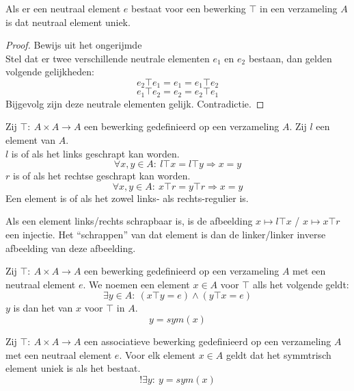 \documentclass[main.tex]{subfiles}
\begin{document}
\begin{st}
  \label{st:neutraal-element-uniek}
  Als er een neutraal element $e$ bestaat voor een bewerking $\top$ in een verzameling $A$ is dat neutraal element uniek.
  \begin{proof}
    Bewijs uit het ongerijmde\\
    Stel dat er twee verschillende neutrale elementen $e_{1}$ en $e_{2}$ bestaan, dan gelden volgende gelijkheden:    \[ e_{2}\top e_{1} = e_{1}  =e_{1}\top e_{2}\]
    \[ e_{1}\top e_{2} = e_{2}  =e_{2}\top e_{1}\]
    Bijgevolg zijn deze neutrale elementen gelijk. Contradictie.
  \end{proof}
\end{st}

\begin{de}
  Zij $\top:\ A\times A\rightarrow A$ een bewerking gedefinieerd op een verzameling $A$.
  Zij $l$ een element van $A$.\\
  $l$ is  of  als het links geschrapt kan worden.
  \[ \forall x,y \in A:\ l \top x = l \top y \Rightarrow x = y \]
  $r$ is  of  als het rechtse geschrapt kan worden.
  \[ \forall x,y \in A:\ x \top r = y \top r \Rightarrow x = y \]
  Een element is  of  als het zowel links- als rechts-regulier is. 
\end{de}

\begin{opm}
  Als een element links/rechts schrapbaar is, is de afbeelding $x \mapsto l\top x$ / $x \mapsto x\top r$ een injectie. Het ``schrappen'' van dat element is dan de linker/linker inverse afbeelding van deze afbeelding.
\end{opm}

\begin{de}
  Zij $\top:\ A\times A\rightarrow A$ een bewerking gedefinieerd op een verzameling $A$ met een neutraal element $e$.
  We noemen een element $x\in A$  voor $\top$ alls het volgende geldt:
  \[ \exists y \in A:\ (x \top y = e) \wedge (y \top x = e) \]
  $y$ is dan het  van $x$ voor $\top$ in $A$.
  \[ y = sym(x) \]
\end{de}

\begin{st}
  Zij $\top:\ A\times A\rightarrow A$ een associatieve bewerking gedefinieerd op een verzameling $A$ met een neutraal element $e$.
  Voor elk element $x \in A$ geldt dat het symmtrisch element uniek is als het bestaat.
  \[ !\exists y:\ y = sym(x) \]

\end{st}
\end{document}
